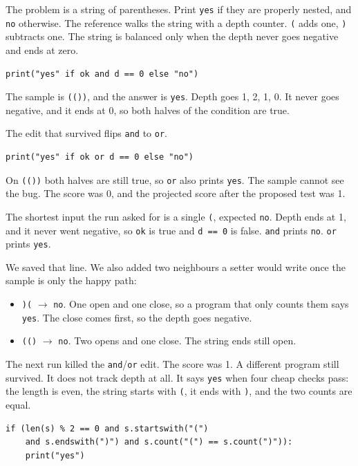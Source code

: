 \documentclass[11pt,a4paper]{article}
\begin{document}
The problem is a string of parentheses. Print \texttt{yes} if they are properly nested, and \texttt{no} otherwise. The reference walks the string with a depth counter. \texttt{(} adds one, \texttt{)} subtracts one. The string is balanced only when the depth never goes negative and ends at zero.

\begin{lstlisting}
print("yes" if ok and d == 0 else "no")
\end{lstlisting}

The sample is \texttt{(())}, and the answer is \texttt{yes}. Depth goes 1, 2, 1, 0. It never goes negative, and it ends at 0, so both halves of the condition are true.

The edit that survived flips \texttt{and} to \texttt{or}.

\begin{lstlisting}
print("yes" if ok or d == 0 else "no")
\end{lstlisting}

On \texttt{(())} both halves are still true, so \texttt{or} also prints \texttt{yes}. The sample cannot see the bug. The score was 0, and the projected score after the proposed test was 1.

The shortest input the run asked for is a single \texttt{(}, expected \texttt{no}. Depth ends at 1, and it never went negative, so \texttt{ok} is true and \texttt{d == 0} is false. \texttt{and} prints \texttt{no}. \texttt{or} prints \texttt{yes}.

We saved that line. We also added two neighbours a setter would write once the sample is only the happy path:

\begin{itemize}
\item \texttt{)(} $\to$ \texttt{no}. One open and one close, so a program that only counts them says \texttt{yes}. The close comes first, so the depth goes negative.
\item \texttt{(()} $\to$ \texttt{no}. Two opens and one close. The string ends still open.
\end{itemize}

The next run killed the \texttt{and}/\texttt{or} edit. The score was 1. A different program still survived. It does not track depth at all. It says \texttt{yes} when four cheap checks pass: the length is even, the string starts with \texttt{(}, it ends with \texttt{)}, and the two counts are equal.

\begin{lstlisting}
if (len(s) % 2 == 0 and s.startswith("(")
    and s.endswith(")") and s.count("(") == s.count(")")):
    print("yes")
\end{lstlisting}
\end{document}

